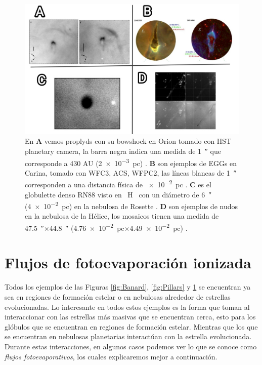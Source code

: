 \documentclass{book}
\begin{document}
\begin{figure}[htb]
    \centering
    \includegraphics[width=1 \textwidth]{images Chapter 1/C1_Globulettes.jpg}
    \caption{En \textbf{A} vemos proplyds con su bowshock en Orion
      tomado con HST planetary camera, la barra negra indica una
      medida de \SI{1}{\arcsecond} que corresponde a 430 AU
      (\SI{2e-3}{pc}) \citep{Garcia-Arredondo:2001}. \textbf{B} son
      ejemplos de EGGs en Carina, tomado con WFC3, ACS, WFPC2, las
      líneas blancas de \SI{1}{\arcsecond} corresponden a una
      distancia física de \SI{e-2}{pc} \citep{Mesa-Delgado:2016}.
      \textbf{C} es el globulette denso RN88 visto en \SI{}{H\alpha} con un
      diámetro de \SI{6}{\arcsecond} (\SI{4e-2}{pc}) en la nebulosa de
      Rosette \citep{GFGahm:2013}. \textbf{D} son ejemplos de nudos en
      la nebulosa de la Hélice, los mosaicos tienen una medida de
      \SI{47.5}{\arcsecond}$\times$\SI{44.8}{\arcsecond}
      (\SI{4.76e-2}{pc}$\times$\SI{4.49e-2}{pc}) \citep{O'Dell:2007}. }
    \label{fig:nudos}
\end{figure}



\section{Flujos de fotoevaporación ionizada} \label{Sec:fluijos fotoevaporativos}

Todos los ejemplos de las Figuras \ref{fig:Banard}, \ref{fig:Pillars}
y \ref{fig:nudos} se encuentran ya sea en regiones de formación
estelar o en nebulosas alrededor de estrellas evolucionadas. Lo
interesante en todos estos ejemplos es la forma que toman al
interaccionar con las estrellas más masivas que se encuentran cerca,
esto para los glóbulos que se encuentran en regiones de formación
estelar. Mientras que los que se encuentran en nebulosas planetarias
interactúan con la estrella evolucionada. Durante estas interacciones,
en algunos casos podemos ver lo que se conoce como \textit{flujos
  fotoevaporativos}, los cuales explicaremos mejor a continuación.
\end{document}
